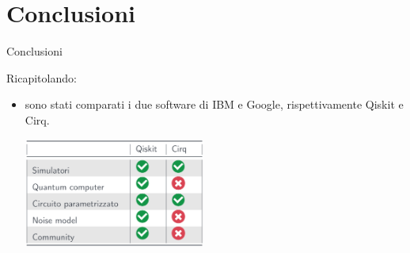 \documentclass{beamer}
\renewcommand{\'}[0]{\`}
\begin{document}
\section{Conclusioni}
	
	\begin{frame}{Conclusioni}
	
	Ricapitolando: \pause
	
	\begin{itemize}
	\item sono stati comparati i due software di IBM e Google, rispettivamente Qiskit e Cirq. \pause
\begin{center}
 \includegraphics[width=0.47\textwidth]{./image/TabellaConfronto.png} 
 \end{center} \pause
 

	
	

\end{itemize}
\end{frame}
\end{document}
